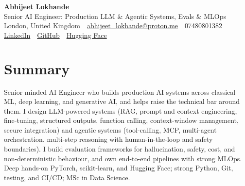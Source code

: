 \documentclass[10pt,a4paper]{article}
\newcommand{\sep}{\,\textcolor{accent!60}{\textbar}\,}
\begin{document}
\begin{center}
  {\fontsize{24}{26}\selectfont\bfseries Abhijeet Lokhande}\\[3pt]
  {\color{accent}\large Senior AI Engineer: Production LLM \& Agentic Systems, Evals \& MLOps}\\[5pt]
  {\small
    London, United Kingdom \sep
    \href{mailto:abhijeet_lokhande@proton.me}{abhijeet\_lokhande@proton.me} \sep
    07480801382 \\[2pt]
    \href{https://www.linkedin.com/in/ablds/}{LinkedIn} \sep
    \href{https://github.com/abhijeetscode}{GitHub} \sep
    \href{https://huggingface.co/ab-ai}{Hugging Face}
  }
\end{center}
\vspace{2pt}

\section{Summary}
Senior-minded AI Engineer who builds production AI systems across classical ML, deep learning, and generative AI, and helps raise the technical bar around them. I design LLM-powered systems (RAG, prompt and context engineering, fine-tuning, structured outputs, function calling, context-window management, secure integration) and agentic systems (tool-calling, MCP, multi-agent orchestration, multi-step reasoning with human-in-the-loop and safety boundaries). I build evaluation frameworks for hallucination, safety, cost, and non-deterministic behaviour, and own end-to-end pipelines with strong MLOps. Deep hands-on PyTorch, scikit-learn, and Hugging Face; strong Python, Git, testing, and CI/CD; MSc in Data Science.

\end{document}

